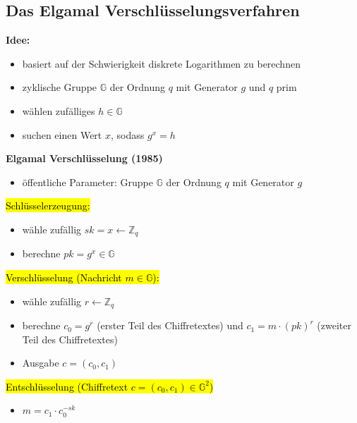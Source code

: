 \documentclass[a4paper, 10pt]{article}
\begin{document}
\subsection{Das Elgamal Verschlüsselungsverfahren}
\textbf{Idee:}
\begin{itemize}
    \item basiert auf der Schwierigkeit diskrete Logarithmen zu berechnen
    \item zyklische Gruppe $\mathbb{G}$ der Ordnung $q$ mit Generator $g$ und $q$ prim
    \item wählen zufälliges $h \in \mathbb{G}$
    \item suchen einen Wert $x$, sodass $g^x = h$
\end{itemize}
\textbf{Elgamal Verschlüsselung (1985)}
\begin{itemize}
    \item öffentliche Parameter: Gruppe $\mathbb{G}$ der Ordnung $q$ mit Generator $g$
\end{itemize}
\hl{Schlüsselerzeugung:}
\begin{itemize}
    \item wähle zufällig $sk= x \longleftarrow \mathbb{Z}_q$
    \item berechne $pk = g^x \in \mathbb{G}$
\end{itemize}
\hl{Verschlüsselung (Nachricht $m \in \mathbb{G}$):}
\begin{itemize}
    \item wähle zufällig $r \longleftarrow \mathbb{Z}_q$ 
    \item berechne $c_0 = g^r$ (erster Teil des Chiffretextes) und $c_1 = m \cdot (pk)^r$ (zweiter Teil des Chiffretextes)
    \item Ausgabe $c = (c_0, c_1)$
\end{itemize}
\hl{Entschlüsselung (Chiffretext $c= (c_0, c_1) \in \mathbb{G}^2$)}
\begin{itemize}
    \item $m = c_1 \cdot c_0 ^{-sk}$
\end{itemize}
\end{document}
